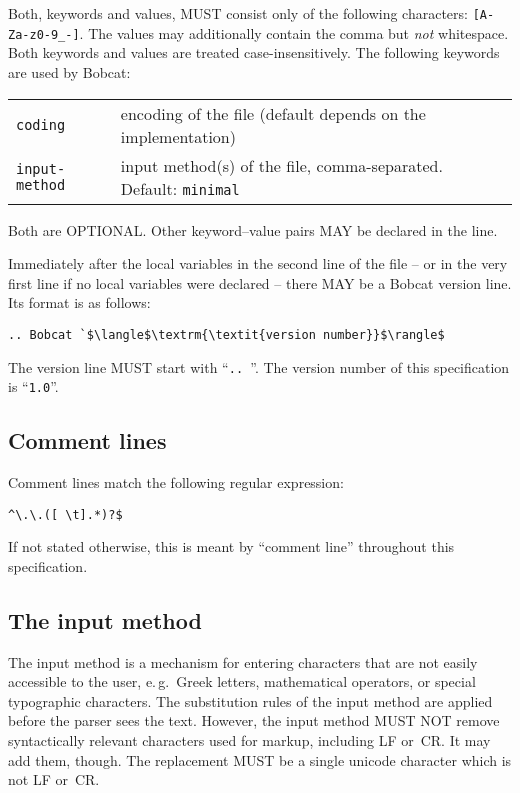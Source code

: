 \documentclass[12pt,openany]{book}
\begin{document}
Both, keywords and values, MUST consist only of the following characters:
\verb|[A-Za-z0-9_-]|.  The values may additionally contain the comma but
\emph{not} whitespace.  Both keywords and values are treated
case-insensitively.  The following keywords are used by Bobcat:

\begin{center}
\begin{tabular}{@{}lp{7cm}@{}}
  \toprule
  \verb|coding| & encoding of the file (default depends on the implementation)\\
  \verb|input-method| & input method(s) of the file, comma-separated.  Default:
                          \verb|minimal|\\
  \bottomrule
\end{tabular}
\end{center}

\noindent
Both are OPTIONAL\@.  Other keyword--value pairs MAY be declared in the line.

\bigskip
%
Immediately after the local variables in the second line of the file -- or in
the very first line if no local variables were declared -- there MAY be a Bobcat
version line.  Its format is as follows:
\begin{lstlisting}[escapechar=`]
.. Bobcat `$\langle$\textrm{\textit{version number}}$\rangle$
\end{lstlisting}
The version line MUST start with ``\verb*|.. |''.  The version number of this
specification is ``\verb|1.0|''.


\subsection{Comment lines}

Comment lines match the following regular expression:

\begin{verbatim}
^\.\.([ \t].*)?$
\end{verbatim}

\noindent
If not stated otherwise, this is meant by ``comment line'' throughout this
specification.

\subsection{The input method}
\label{sec:input-method}

The input method is a mechanism for entering characters that are not easily
accessible to the user, e.\,g.\ Greek letters, mathematical operators, or
special typographic characters.  The substitution rules of the input method are
applied before the parser sees the text.  However, the input method MUST NOT
remove syntactically relevant characters used for markup, including LF or~CR\@.
It may add them, though.  The replacement MUST be a single unicode character
which is not LF or~CR\@.
\end{document}
